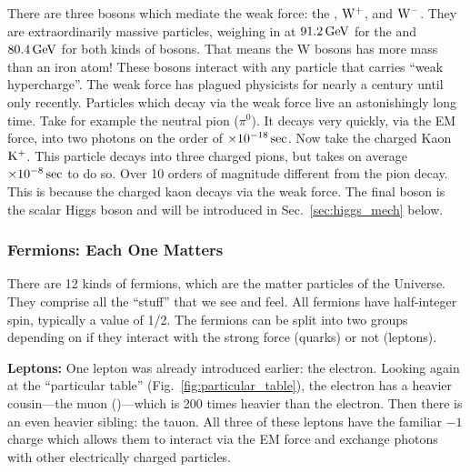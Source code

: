 There are three bosons which mediate the weak force: the \PZ, $\mathrm{W}^+$, and $\mathrm{W}^-$.
They are extraordinarily massive particles, weighing in at $91.2\,\text{Ge\hspace{-.08em}V}$ for the \PZ and $80.4\,\text{Ge\hspace{-.08em}V}$ for both kinds of \PW bosons. 
That means the W bosons has more mass than an iron atom!
These bosons interact with any particle that carries ``weak hypercharge''.
The weak force has plagued physicists for nearly a century until only recently.
Particles which decay via the weak force live an astonishingly long time. 
Take for example the neutral pion ($\pi^0$). 
It decays very quickly, via the EM force, into two photons on the order of $\times \text{10}^\text{$-$18}\sec$.
Now take the charged Kaon ${\rm K^+}$. 
This particle decays into three charged pions, but takes on average $\times \text{10}^\text{$-$8}\sec$ to do so.
Over 10 orders of magnitude different from the pion decay.
This is because the charged kaon decays via the weak force.
The final boson is the scalar Higgs boson and will be introduced in Sec.~\ref{sec:higgs_mech} below.


\subsubsection{Fermions: Each One Matters}
There are 12 kinds of fermions, which are the matter particles of the Universe. 
They comprise all the ``stuff'' that we see and feel.
All fermions have half-integer spin, typically a value of 1/2. 
The fermions can be split into two groups depending on if they interact with the strong force (quarks) or not (leptons).

{\bf Leptons:}
One lepton was already introduced earlier: the electron.
Looking again at the ``particular table'' (Fig.~\ref{fig:particular_table}), the electron has a heavier cousin---the muon (\Pmu)---which is 200 times heavier than the electron. 
Then there is an even heavier sibling: the tauon. 
All three of these leptons have the familiar $-1$ charge which allows them to interact via the EM force and exchange photons with other electrically charged particles.

